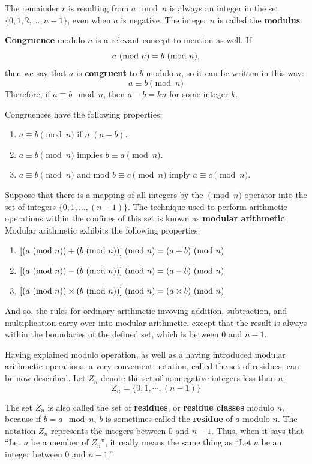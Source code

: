 The remainder $r$ is resulting from $a \mod n$ is always an integer in the set $\{0, 1, 2, \dots, n-1\}$, even when $a$ is negative. The integer $n$ is called the \textbf{modulus}. 

\textbf{Congruence} modulo $n$ is a relevant concept to mention as well. If
\[
  a \ (\text{mod}\ n) = b \ (\text{mod}\ n),
\]
\noindent then we say that $a$ is \textbf{congruent} to $b$ modulo $n$, so it can be written in this way:
\[
a \equiv b \pmod n
\]
Therefore, if $a \equiv b \mod n$, then $a-b=kn$ for some integer $k$. 

Congruences have the following properties: 
\begin{enumerate}
\item $a \equiv b \pmod n$ if $n|(a-b)$.
\item $a \equiv b \pmod n$ implies $b \equiv a \pmod n$.
\item $a \equiv b \pmod n$ and mod $b \equiv c \pmod n$  imply $a \equiv c \pmod n$.
\end{enumerate}

Suppose that there is a mapping of all integers by the $\pmod n$ operator into the set of integers $\{0, 1, \dots, (n-1)\}$. The technique used to perform arithmetic operations within the confines of this set is known as \textbf{modular arithmetic}. Modular arithmetic exhibits the following properties:

\begin{enumerate}
\item $[(a \ (\text{mod}\ n)) + (b \ (\text{mod}\ n))] \ (\text{mod}\ n) = (a + b) \ (\text{mod}\ n)$
\item $[(a \ (\text{mod}\ n)) - (b \ (\text{mod}\ n))] \ (\text{mod}\ n) = (a - b) \ (\text{mod}\ n)$
\item $[(a \ (\text{mod}\ n)) \times (b \ (\text{mod}\ n))] \ (\text{mod}\ n) = (a \times b) \ (\text{mod}\ n)$
\end{enumerate}
And so, the rules for ordinary arithmetic invoving addition, subtraction, and multiplication carry over into modular arithmetic, except that the result is always within the boundaries of the defined set, which is between 0 and $n-1$.

Having explained modulo operation, as well as a having introduced modular arithmetic operations, a very convenient notation, called the set of residues, can be now described. Let $Z_{n}$ denote the set of nonnegative integers less than $n$:
\[
Z_{n} = \{0,1,\cdots, (n-1)\}
\]

The set $Z_{n}$ is also called the set of \textbf{residues}, or \textbf{residue classes} modulo $n$, because if $b=a \mod n$, $b$ is sometimes called the \textbf{residue} of $a$ modulo $n$. The notation $Z_{n}$ represents the integers between 0 and $n-1$. Thus, when it says that ``Let $a$ be a member of $Z_{n}$'', it really means the same thing as ``Let $a$ be an integer between 0 and $n-1$.''

